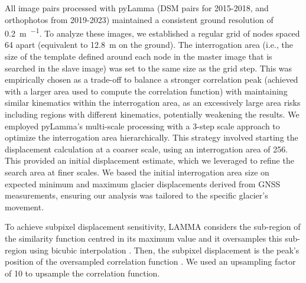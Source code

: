 All image pairs processed with pyLamma (DSM pairs for 2015-2018, and orthophotos from 2019-2023) maintained a 
consistent ground resolution of \SI{0.2}{\meter\per\pixel}. 
To analyze these images, we established a regular grid of nodes spaced \SI{64}{\pixel} apart (equivalent to \SI{12.8}{\meter} 
on the ground).
The interrogation area (i.e., the size of the template defined around each node in the master image that is searched in the slave image)
was set to the same size as the grid step.
This was empirically chosen as a trade-off to balance a stronger correlation peak (achieved with a larger area used to 
compute the correlation function) with maintaining similar kinematics within the interrogation area, as an excessively 
large area risks including regions with different kinematics, potentially weakening the results. 
We employed pyLamma's multi-scale processing with a 3-step scale approach to optimize the interrogation area hierarchically.  
This strategy involved starting the displacement calculation at a coarser scale, using an interrogation area of \SI{256}{\pixel}. 
This provided an initial displacement estimate, which we leveraged to refine the search area at finer scales.  
We based the initial interrogation area size on expected minimum and maximum glacier displacements derived from GNSS measurements, 
ensuring our analysis was tailored to the specific glacier's movement.

To achieve subpixel displacement sensitivity, LAMMA considers the sub-region of the similarity function centred 
in its maximum value and it oversamples this sub-region using bicubic interpolation \citep{Dematteis2022}.
Then, the subpixel displacement is the peak's position of the oversampled correlation function \citep{Debella_Gilo2011}.
We used an upsampling factor of 10 to upsample the correlation function. 



